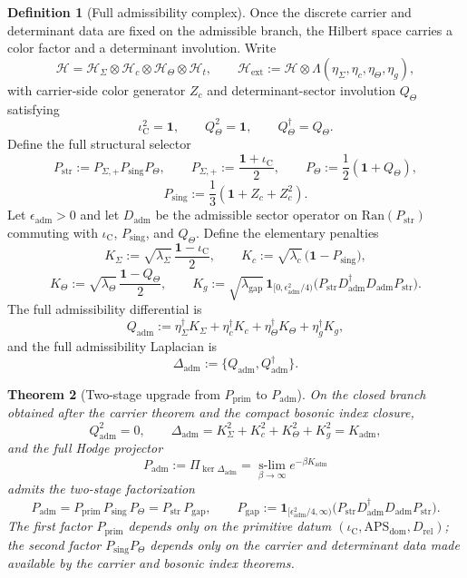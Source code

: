 \documentclass[11pt,a4paper]{article}
\newtheorem{theorem}{Theorem}[section]
\theoremstyle{definition}
\newtheorem{definition}[theorem]{Definition}
\theoremstyle{remark}
\newcommand{\Seam}{\Sigma}
\newcommand{\iC}{\iota_{\mathrm C}}
\newcommand{\Kadm}{K_{\mathrm{adm}}}
\newcommand{\APSdom}{\mathrm{APS}_{\mathrm{dom}}}
\newcommand{\Padm}{P_{\mathrm{adm}}}
\newcommand{\Pprim}{P_{\mathrm{prim}}}
\begin{document}
\begin{definition}[Full admissibility complex]
\label{def:full-admissibility-complex}
Once the discrete carrier and determinant data are fixed on the admissible branch, the Hilbert
space carries a color factor and a determinant involution. Write
\[
\mathcal H=\mathcal H_{\Seam}\otimes\mathcal H_c\otimes\mathcal H_\Theta\otimes\mathcal H_t,
\qquad
\mathcal H_{\mathrm{ext}}
:=
\mathcal H\otimes\Lambda(\eta_\Sigma,\eta_c,\eta_\Theta,\eta_g),
\]
with carrier-side color generator $Z_c$ and determinant-sector involution $Q_\Theta$ satisfying
\[
\iC^2=\mathbf 1,
\qquad
Q_\Theta^2=\mathbf 1,
\qquad
Q_\Theta^\dagger=Q_\Theta.
\]
Define the full structural selector
\[
P_{\mathrm{str}}:=P_{\Seam,+}P_{\mathrm{sing}}P_\Theta,
\qquad
P_{\Seam,+}:=\frac{\mathbf 1+\iC}{2},
\qquad
P_\Theta:=\frac12(\mathbf 1+Q_\Theta),
\]
\[
P_{\mathrm{sing}}:=\frac13(\mathbf 1+Z_c+Z_c^2).
\]
Let $\epsilon_{\mathrm{adm}}>0$ and let $D_{\mathrm{adm}}$ be the admissible sector operator on
$\mathrm{Ran}(P_{\mathrm{str}})$ commuting with $\iC$, $P_{\mathrm{sing}}$, and $Q_\Theta$.
Define the elementary penalties
\[
K_\Sigma:=\sqrt{\lambda_\Sigma}\,\frac{\mathbf 1-\iC}{2},
\qquad
K_c:=\sqrt{\lambda_c}\,\bigl(\mathbf 1-P_{\mathrm{sing}}\bigr),
\]
\[
K_\Theta:=\sqrt{\lambda_\Theta}\,\frac{\mathbf 1-Q_\Theta}{2},
\qquad
K_g:=\sqrt{\lambda_{\mathrm{gap}}}\,\mathbf 1_{[0,\epsilon_{\mathrm{adm}}^2/4)}\!\bigl(P_{\mathrm{str}}D_{\mathrm{adm}}^\dagger D_{\mathrm{adm}}P_{\mathrm{str}}\bigr).
\]
The full admissibility differential is
\[
Q_{\mathrm{adm}}
:=
\eta_\Sigma^\dagger K_\Sigma
+\eta_c^\dagger K_c
+\eta_\Theta^\dagger K_\Theta
+\eta_g^\dagger K_g,
\]
and the full admissibility Laplacian is
\[
\Delta_{\mathrm{adm}}:=\{Q_{\mathrm{adm}},Q_{\mathrm{adm}}^\dagger\}.
\]
\end{definition}

\begin{theorem}[Two-stage upgrade from $\Pprim$ to $\Padm$]
\label{thm:padm-upgrade}
On the closed branch obtained after the carrier theorem and the compact bosonic index closure,
\[
Q_{\mathrm{adm}}^2=0,
\qquad
\Delta_{\mathrm{adm}}=K_\Sigma^2+K_c^2+K_\Theta^2+K_g^2=\Kadm,
\]
and the full Hodge projector
\[
\Padm
:=
\Pi_{\ker\Delta_{\mathrm{adm}}}
=
\operatorname*{s-lim}_{\beta\to\infty}e^{-\beta\Kadm}
\]
admits the two-stage factorization
\[
\Padm
=
\Pprim\,P_{\mathrm{sing}}\,P_\Theta
=
P_{\mathrm{str}}\,P_{\mathrm{gap}},
\qquad
P_{\mathrm{gap}}
:=
\mathbf 1_{[\epsilon_{\mathrm{adm}}^2/4,\infty)}\!\bigl(P_{\mathrm{str}}D_{\mathrm{adm}}^\dagger D_{\mathrm{adm}}P_{\mathrm{str}}\bigr).
\]
The first factor $\Pprim$ depends only on the primitive datum
$(\iC,\APSdom,D_{\mathrm{rel}})$; the second factor $P_{\mathrm{sing}}P_\Theta$ depends only on
the carrier and determinant data made available by the carrier and bosonic index theorems.
\end{theorem}
\end{document}
